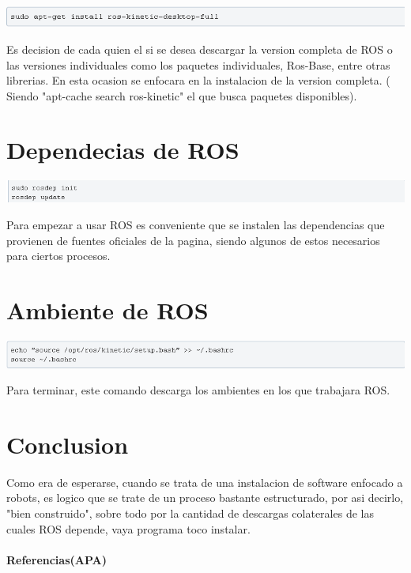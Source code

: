\documentclass[11pt,a4paper]{article}
\begin{document}
\includegraphics[scale=0.8]{EV1/4.png}

Es decision de cada quien el si se desea descargar la version completa de ROS o las versiones individuales como los paquetes individuales, Ros-Base, entre otras librerias. En esta ocasion se enfocara en la instalacion de la version completa. ( Siendo "apt-cache search ros-kinetic" el que busca paquetes disponibles).

\section{Dependecias de ROS}

\includegraphics[scale=0.8]{EV1/5.png}

Para empezar a usar ROS es conveniente que se instalen las dependencias que provienen de fuentes oficiales de la pagina, siendo algunos de estos necesarios para ciertos procesos. 

\section{Ambiente de ROS}

\includegraphics[scale=0.8]{EV1/6.png}

Para terminar, este comando descarga los ambientes en los que trabajara ROS.

\section{Conclusion}

Como era de esperarse, cuando se trata de una instalacion de software enfocado a robots, es logico que se trate de un proceso bastante estructurado, por asi decirlo, "bien construido", sobre todo por la cantidad de descargas colaterales de las cuales ROS depende, vaya programa toco instalar. \\ 

\paragraph{Referencias(APA)}\\
\end{document}
